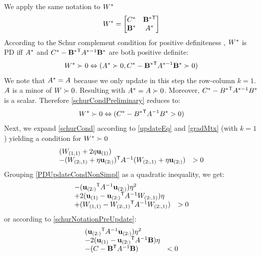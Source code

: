 \documentclass{article}
\begin{document}
We apply the same notation to ${{W^*}}$
\begin{equation}
{{{W^*}}}= \left[ \begin{matrix} C^* & \mathbf{B^*}{}^\mathsf{T} \\ \mathbf{B^*} & {A^*} \end{matrix} \right]
\end{equation}
According to the Schur complement condition for positive definiteness , ${{W^*}}$ is PD iff ${A}^*$ and $C^* - \mathbf{B}^*{}^\mathsf{T} {A}^{*-1} \mathbf{B}^*$ are both positive definite:
\begin{equation}
{{W^*}} \succ  0 \Leftrightarrow ({A}^* \succ  0, C^* - \mathbf{B}^*{}^\mathsf{T} {A}^{*-1} \mathbf{B}^* \succ  0)
\label{schurCondPreliminary}
\end{equation}
We note that ${A}^* = {A}$ because we only update in this step the row-column $k=1$. ${A}$ is a minor of ${W} \succ  0$. Resulting with ${A}^*={A} \succ  0$. Moreover, $C^* - B^*{}^\mathsf{T} A^{*-1} B^*$ is a scalar. Therefore \eqref{schurCondPreliminary} reduces to:
\begin{equation}
{W^*} \succ  0 \Leftrightarrow (C^* - B^*{}^\mathsf{T} A^{-1} B^* >  0)
\label{schurCond}
\end{equation}
Next, we expand \eqref{schurCond} according to \eqref{updateEq} and \eqref{gradMtx} (with $k=1$) yielding a condition for ${{W^*}} \succ  0$
\begin{equation}
\begin{array}{ll} 
({W}_{(1,1)} + 2\eta \mathbf{u}_{(1)})  \\
-({W}_{(2:,1)} + \eta \mathbf{u}_{(2:)}){}^\mathsf{T} {A}^{-1} ({W}_{(2:,1)} + \eta \mathbf{u}_{(2:)})  & > 0
\end{array}
\label{PDUpdateCondNonSimpl}
\end{equation}
Grouping \eqref{PDUpdateCondNonSimpl} as a quadratic inequality, we get:
\begin{equation}
\begin{array}{ll} 
-(\mathbf{u}_{(2:)}{}^\mathsf{T} {A}^{-1} \mathbf{u}_{(2:)})\eta^2 \\
+2(\mathbf{u}_{(1)} - \mathbf{u}_{(2:)}{}^\mathsf{T} {A}^{-1}{W}_{(2:,1)})\eta\\
+({W}_{(1,1)} - {W}_{(2:,1)}{}^\mathsf{T}  {A}^{-1} {W}_{(2:,1)}) & > 0
\end{array}
\label{PDUpdateCondQuadFormWithW}
\end{equation}
or according to \eqref{schurNotationPreUpdate}:
\begin{equation}
\begin{array}{ll} 
(\mathbf{u}_{(2:)}{}^\mathsf{T} {A}^{-1} \mathbf{u}_{(2:)}) \eta^2 \\
-2(\mathbf{u}_{(1)} - \mathbf{u}_{(2:)}{}^\mathsf{T} {A}^{-1}\mathbf{B})\eta \\
-(C - \mathbf{B}{}^\mathsf{T}  {A}^{-1} \mathbf{B}) & < 0
\end{array}
\label{PDUpdateCondQuadForm}
\end{equation}
\end{document}
